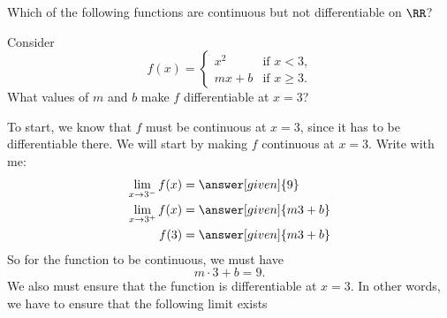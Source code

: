 \documentclass{ximera}
\begin{document}
\begin{question}
  Which of the following functions are continuous but not
  differentiable on $\RR$?
  \begin{multipleChoice}
  \end{multipleChoice}
\end{question}

\begin{example}
  Consider
  \[
  f(x) = \begin{cases}
          x^2 &\text{if $x<3$,}\\
          mx+b &\text{if $x\ge 3$.}
         \end{cases}
  \]
  What values of $m$ and $b$ make $f$ differentiable at $x=3$?
  \begin{explanation}
    To start, we know that  $f$ must be continuous at $x=3$, since it has to be
    differentiable there. We will start by making $f$  continuous at
    $x=3$. Write with me:
    \begin{align*}
      \lim_{x\to 3^-} f(x) &= \answer[given]{9}\\
      \lim_{x\to 3^+} f(x) &= \answer[given]{m 3 + b}\\
      f(3) &= \answer[given]{m 3 + b}
    \end{align*}
    So for the function to be continuous, we must have
    \[
    m\cdot 3 + b =9.
    \]
    We also must ensure that the function is differentiable at $x=3$. In other words, we have to ensure that the following limit exists


\end{explanation}
\end{example}
\end{document}
